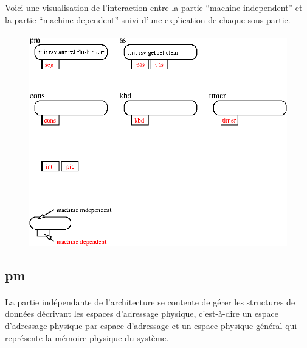 \documentclass[10pt,a4wide]{article}
\begin{document}
Voici une visualisation de l'interaction entre la partie
``machine independent'' et la partie ``machine dependent'' suivi
d'une explication de chaque sous partie.

\paragraph{}

\begin{figure}[h]
\centerline{\includegraphics{figures/visualisation.eps}}
\end{figure}

\subsection{pm}

\paragraph{}

La partie ind\'ependante de l'architecture se contente de g\'erer les
structures de donn\'ees d\'ecrivant les espaces d'adressage physique,
c'est-\`a-dire un espace d'adressage physique par espace d'adressage
et un espace physique g\'en\'eral qui repr\'esente la m\'emoire
physique du syst\`eme.

\paragraph{}
\end{document}
